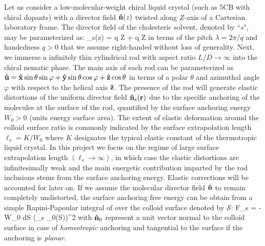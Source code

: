 Let us consider a low-molecular-weight chiral liquid crystal (such as 5CB with chiral dopants) with a director field ${\bf \hat{n}}(z)$ twisted along $Z$-axis of a Cartesian laboratory frame. The director field of the cholesteric solvent, denoted by ``$s$",  may be parameterized as:
\beq
\bn_{s}(z) = \bx \cos q Z  + \by \sin q Z
\label{ns}
\eeq
in terms of the pitch  $\lambda = 2 \pi/q$ and handedness $q>0$ that we assume right-handed without loss of generality.
Next, we immerse a infinitely thin cylindrical rod with aspect ratio $L/D \rightarrow \infty$ into the chiral nematic  phase. The main axis of each rod can be parameterized as ${\bf \hat{u}} = {\bf \hat{x}} \sin \theta \sin \varphi + {\bf \hat{y}} \sin \theta \cos \varphi + {\bf \hat{z}} \cos \theta $ in terms of a polar $\theta$ and azimuthal angle $\varphi$ with respect to the helical axis ${\bf \hat{z}}$. The presence of the rod will generate elastic distortions of the uniform director field ${\bf \hat{n}}_{s}({\bf r})$ due to the specific anchoring of the molecules at the surface of the rod, quantified by  the surface anchoring energy  $W_{0}>0$ (units energy surface area). The extent of elastic deformation around the colloid surface ratio is commonly indicated by the surface extrapolation length $\ell_{s} = K/W_{0}$ where $K$ designates the typical elastic constant of the thermotropic liquid crystal.   In this project we focus on  the regime of large surface extrapolation length $ ( \ell_{s} \rightarrow \infty )$, in which case the elastic distortions are infinitesimally weak and the main energetic contribution imparted by the rod inclusions stems from the surface anchoring energy. Elastic corrections will be accounted for later on.   If we assume the molecular director field  ${\bf \hat{n}}$ to remain completely undistorted,  the surface anchoring free energy can be obtain from a simple Rapini-Papoular integral of  over the colloid surface denoted by ${\mathcal S}$:
\beq
F_{s} = - W_{0} \oint d{\mathcal S}  (\bn_{s} \cdot \bn_{0}({\mathcal S}))^{2}
\label{rapo}
\eeq
with ${\bf \hat{n}}_{0}$ represent a unit vector normal to the colloid surface in case of {\em homeotropic} anchoring and tangential to the surface if the anchoring is {\em planar}.


